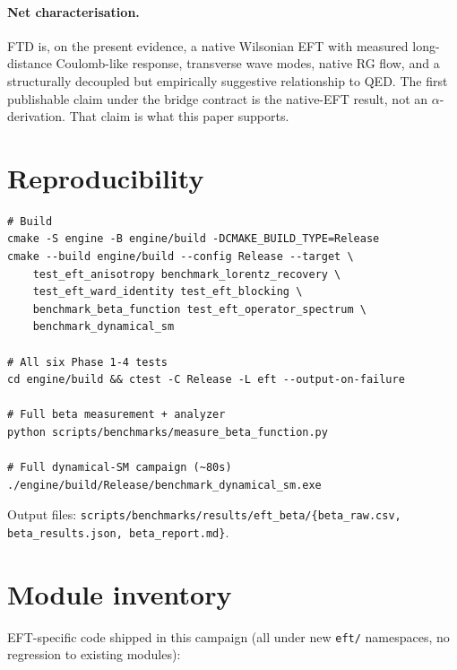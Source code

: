 \documentclass[11pt,letterpaper]{article}
\begin{document}
\paragraph{Net characterisation.}
FTD is, on the present evidence, a native Wilsonian EFT with measured
long-distance Coulomb-like response, transverse wave modes, native RG
flow, and a structurally decoupled but empirically suggestive
relationship to QED. The first publishable claim under the bridge
contract is the native-EFT result, not an $\alpha$-derivation. That
claim is what this paper supports.

\appendix

\section{Reproducibility}

\begin{verbatim}
# Build
cmake -S engine -B engine/build -DCMAKE_BUILD_TYPE=Release
cmake --build engine/build --config Release --target \
    test_eft_anisotropy benchmark_lorentz_recovery \
    test_eft_ward_identity test_eft_blocking \
    benchmark_beta_function test_eft_operator_spectrum \
    benchmark_dynamical_sm

# All six Phase 1-4 tests
cd engine/build && ctest -C Release -L eft --output-on-failure

# Full beta measurement + analyzer
python scripts/benchmarks/measure_beta_function.py

# Full dynamical-SM campaign (~80s)
./engine/build/Release/benchmark_dynamical_sm.exe
\end{verbatim}

Output files: \texttt{scripts/benchmarks/results/eft\_beta/\{beta\_raw.csv,
beta\_results.json, beta\_report.md\}}.

\section{Module inventory}

EFT-specific code shipped in this campaign (all under new \texttt{eft/}
namespaces, no regression to existing modules):
\end{document}
